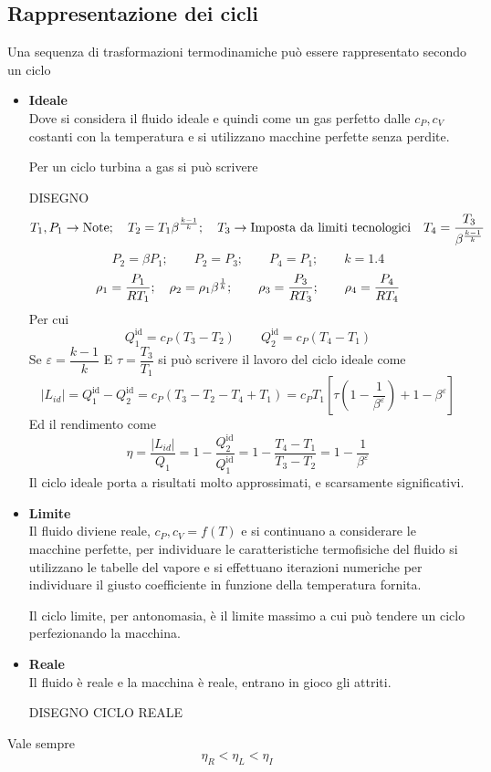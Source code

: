 \subsection{Rappresentazione dei cicli}
\begin{adjustwidth}{2in}{}
	Una sequenza di trasformazioni termodinamiche può essere rappresentato secondo un ciclo 
	\begin{itemize}
		\item \textbf{Ideale}\\
		Dove si considera il fluido ideale e quindi come un gas perfetto dalle $c_P, c_V$ costanti con la temperatura e si utilizzano macchine perfette senza perdite. \newline 
		
		Per un ciclo turbina a gas si può scrivere 
		
		DISEGNO
		\[T_1, P_1\rightarrow\text{Note}; \quad T_2 = T_1\beta^{k-1\over k}; \quad T_3 \rightarrow\text{Imposta da limiti tecnologici} \quad T_4 = \dfrac{T_3}{\beta^{k-1\over k}}\]		
		\[P_2 = \beta P_1; \qquad P_2=P_3; \qquad P_4 = P_1; \qquad k=1.4\]		
		\[\rho_1 = \dfrac{P_1}{RT_1}; \quad \rho_2 = \rho_1\beta^{1\over k}; \qquad \rho_3 = \dfrac{P_3}{RT_3}; \qquad \rho_4 = \dfrac{P_4}{RT_4}\]
		Per cui
		\[Q_1^\text{id} = c_P(T_3-T_2)\qquad Q_2^\text{id} = c_P(T_4-T_1)\]
		Se $\varepsilon = \dfrac{k-1}{k}$  E 
		$\tau = \dfrac{T_3}{T_1}$ si può scrivere il lavoro del ciclo ideale come
		\[|L_{id}| = Q_1^\text{id} - Q_2^\text{id} = c_P(T_3-T_2-T_4+T_1) = c_PT_1\left[\tau\left(1-\dfrac{1}{\beta^\varepsilon}\right)+1 -\beta^\varepsilon\right]\]
		Ed il rendimento come 
		\[\eta = \dfrac{|L_{id}|}{Q_1} = 1-\dfrac{Q_2^\text{id}}{Q_1^\text{id}} = 1 - \dfrac{T_4-T_1}{T_3-T_2} = 1 - \dfrac{1}{\beta^\varepsilon}\]
		Il ciclo ideale porta a risultati molto approssimati, e scarsamente significativi.
		\item \textbf{Limite}\\
		Il fluido diviene reale, $c_P, c_V = f(T)$ e si continuano a considerare le macchine perfette, per individuare le caratteristiche termofisiche del fluido si utilizzano le tabelle del vapore e si effettuano iterazioni numeriche per individuare il giusto coefficiente in funzione della temperatura fornita. \newline 
		
		Il ciclo limite, per antonomasia, è il limite massimo a cui può tendere un ciclo perfezionando la macchina. 
		\item \textbf{Reale}\\
		Il fluido è reale e la macchina è reale, entrano in gioco gli attriti. 
		
		DISEGNO CICLO REALE
	\end{itemize}
	Vale sempre 
	\[\eta_R<\eta_L<\eta_I\]
\end{adjustwidth}




